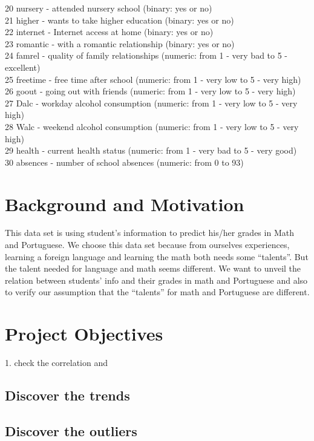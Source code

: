 \documentclass{article}
\begin{document}
20 nursery - attended nursery school (binary: yes or no) \\
21 higher - wants to take higher education (binary: yes or no) \\
22 internet - Internet access at home (binary: yes or no) \\
23 romantic - with a romantic relationship (binary: yes or no) \\
24 famrel - quality of family relationships (numeric: from 1 - very bad to 5 - excellent) \\
25 freetime - free time after school (numeric: from 1 - very low to 5 - very high) \\
26 goout - going out with friends (numeric: from 1 - very low to 5 - very high) \\
27 Dalc - workday alcohol consumption (numeric: from 1 - very low to 5 - very high) \\
28 Walc - weekend alcohol consumption (numeric: from 1 - very low to 5 - very high) \\
29 health - current health status (numeric: from 1 - very bad to 5 - very good) \\
30 absences - number of school absences (numeric: from 0 to 93) \\
\section{Background and Motivation}
This data set is using student's information to predict his/her grades in Math and Portuguese.
We choose this data set because from ourselves experiences, learning a foreign language and learning the math both needs some ``talents''. But the talent needed for language and math seems different. We want to unveil the relation between students' info and their grades in math and Portuguese and also to verify our assumption that the ``talents'' for math and Portuguese are different.
\section{Project Objectives}
1. check the correlation and 
\subsection{Discover the trends}
\subsection{Discover the outliers}
\subsection{}
\end{document}
